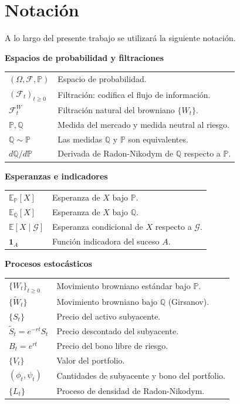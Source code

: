 \documentclass[11pt,a4paper,oneside]{report}
\theoremstyle{plain}
\theoremstyle{definition}
\theoremstyle{remark}
\newcommand{\E}{\mathbb{E}}
\newcommand{\PP}{\mathbb{P}}
\newcommand{\Q}{\mathbb{Q}}
\newcommand{\F}{\mathcal{F}}
\newcommand{\G}{\mathcal{G}}
\newcommand{\1}{\mathbf{1}}
\begin{document}
\chapter*{Notación}

A lo largo del presente trabajo se utilizará la siguiente notación.

\vspace{0.3cm}

\noindent\textbf{Espacios de probabilidad y filtraciones}
\begin{center}
\begin{tabular}{@{}p{4cm}p{10cm}@{}}
$(\Omega, \F, \PP)$ & Espacio de probabilidad. \\
$(\F_t)_{t \geq 0}$ & Filtración: codifica el flujo de información. \\
$\F_t^W$ & Filtración natural del browniano $\{W_t\}$. \\
$\PP, \Q$ & Medida del mercado y medida neutral al riesgo. \\
$\Q \sim \PP$ & Las medidas $\Q$ y $\PP$ son equivalentes. \\
$d\Q/d\PP$ & Derivada de Radon-Nikodym de $\Q$ respecto a $\PP$. \\
\end{tabular}
\end{center}

\vspace{0.2cm}

\noindent\textbf{Esperanzas e indicadores}
\begin{center}
\begin{tabular}{@{}p{4cm}p{10cm}@{}}
$\E_\PP[X]$ & Esperanza de $X$ bajo $\PP$. \\
$\E_\Q[X]$ & Esperanza de $X$ bajo $\Q$. \\
$\E[X \mid \G]$ & Esperanza condicional de $X$ respecto a $\G$. \\
$\1_A$ & Función indicadora del suceso $A$. \\
\end{tabular}
\end{center}

\vspace{0.2cm}

\noindent\textbf{Procesos estocásticos}
\begin{center}
\begin{tabular}{@{}p{4cm}p{10cm}@{}}
$\{W_t\}_{t \geq 0}$ & Movimiento browniano estándar bajo $\PP$. \\
$\{\widetilde W_t\}$ & Movimiento browniano bajo $\Q$ (Girsanov). \\
$\{S_t\}$ & Precio del activo subyacente. \\
$\widetilde S_t = e^{-rt} S_t$ & Precio descontado del subyacente. \\
$B_t = e^{rt}$ & Precio del bono libre de riesgo. \\
$\{V_t\}$ & Valor del portfolio. \\
$(\phi_t, \psi_t)$ & Cantidades de subyacente y bono del portfolio. \\
$\{L_t\}$ & Proceso de densidad de Radon-Nikodym. \\
\end{tabular}
\end{center}
\end{document}

